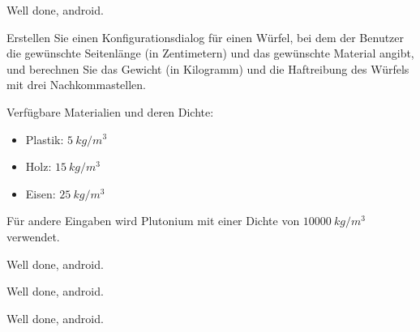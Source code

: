 \begin{frame}[fragile]{Well done, android.}\onslide<+->%
    \begin{exercise}
        Erstellen Sie einen Konfigurationsdialog für einen Würfel, bei dem der Benutzer die gewünschte Seitenlänge (in Zentimetern) und das gewünschte Material angibt, und berechnen Sie das Gewicht (in Kilogramm) und die Haftreibung des Würfels mit drei Nachkommastellen.
        \par\medskip
        Verfügbare Materialien und deren Dichte:\begin{itemize}
            \item Plastik: $5~kg/m^3$
            \item Holz: $15~kg/m^3$
            \item Eisen: $25~kg/m^3$
        \end{itemize}
        Für andere Eingaben wird Plutonium mit einer Dichte von $10000~kg/m^3$ verwendet.
    \end{exercise}
\end{frame}
\begin{frame}[fragile]{Well done, android.}\onslide<+->%
    \begin{solve}
        \scriptsize%
    \end{solve}
\end{frame}
\resetsolve
\begin{frame}[fragile]{Well done, android.}\onslide<+->%
    \begin{solve}
        \scriptsize%
    \end{solve}
    \vspace{-1em}
\end{frame}
\resetsolve
\begin{frame}[fragile]{Well done, android.}\onslide<+->%
    \begin{solve}
        \scriptsize%
    \end{solve}
\end{frame}
\resetsolve

